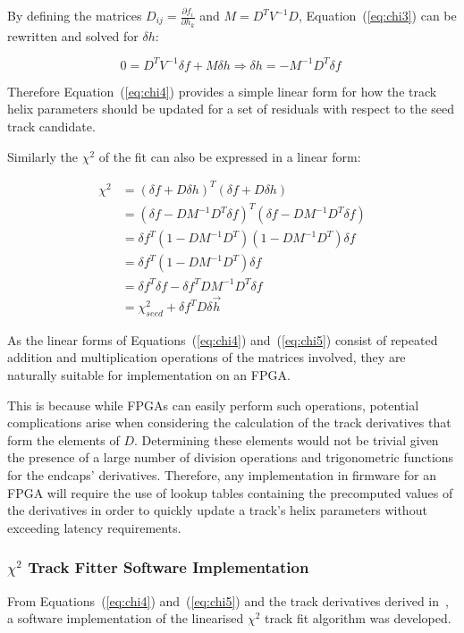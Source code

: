 By defining the matrices $D_{ij} = \frac{\partial f_{i}}{\partial h_{k}}$ and $M = D^{T} V^{-1} D$, Equation~(\ref{eq:chi3}) can be rewritten and solved for $\delta h$:

\begin{equation}
0 = D^{T} V^{-1} \delta f + M \delta h \Rightarrow \delta h = - M^{-1} D^{T} \delta f \;
\label{eq:chi4}
\end{equation}

Therefore Equation~(\ref{eq:chi4}) provides a simple linear form for how the track helix parameters should be updated for a set of residuals with respect to the seed track candidate.

Similarly the $\chi^{2}$ of the fit can also be expressed in a linear form:

\begin{equation}
\begin{split}
\chi^{2} &= (\delta f + D \delta h)^{T}(\delta f + D \delta h) \\
         &= (\delta f - DM^{-1}D^{T}\delta f)^{T} (\delta f - DM^{-1}D^{T}\delta f) \\
         &= \delta f^{T} (1- DM^{-1}D^{T}) (1- DM^{-1}D^{T}) \delta f \\
         &= \delta f^{T} (1- DM^{-1}D^{T}) \delta f \\
         &= \delta f^{T} \delta f - \delta f^{T} DM^{-1}D^{T} \delta f \\
         &= \chi^{2}_{seed} + \delta f^{T} D \delta \overrightarrow{h} 
\end{split}
\label{eq:chi5}
\end{equation}

As the linear forms of Equations~(\ref{eq:chi4}) and~(\ref{eq:chi5}) consist of repeated addition and multiplication operations of the matrices involved, they are naturally suitable for implementation on an FPGA.

This is because while FPGAs can easily perform such operations, potential complications arise when considering the calculation of the track derivatives that form the elements of $D$.
Determining these elements would not be trivial given the presence of a large number of division operations and trigonometric functions for the endcaps' derivatives.
Therefore, any implementation in firmware for an FPGA will require the use of lookup tables containing the precomputed values of the derivatives in order to quickly update a track's helix parameters without exceeding latency requirements.

\subsubsection{$\chi^{2}$ Track Fitter Software Implementation}\label{subsubsec:chi2software}
From Equations~(\ref{eq:chi4}) and~(\ref{eq:chi5}) and the track derivatives derived in~\cite{CMS_DN-14-043}, a software implementation of the linearised $\chi^{2}$ track fit algorithm was developed.


